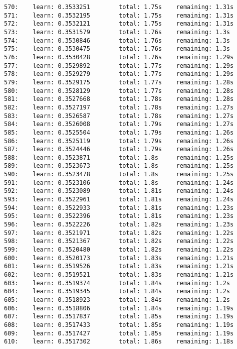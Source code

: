 \documentclass[11pt]{article}
\begin{document}
\begin{Verbatim}[commandchars=\\\{\}]
570:    learn: 0.3533251        total: 1.75s    remaining: 1.31s
571:    learn: 0.3532195        total: 1.75s    remaining: 1.31s
572:    learn: 0.3532121        total: 1.75s    remaining: 1.31s
573:    learn: 0.3531579        total: 1.76s    remaining: 1.3s
574:    learn: 0.3530846        total: 1.76s    remaining: 1.3s
575:    learn: 0.3530475        total: 1.76s    remaining: 1.3s
576:    learn: 0.3530428        total: 1.76s    remaining: 1.29s
577:    learn: 0.3529892        total: 1.77s    remaining: 1.29s
578:    learn: 0.3529279        total: 1.77s    remaining: 1.29s
579:    learn: 0.3529175        total: 1.77s    remaining: 1.28s
580:    learn: 0.3528129        total: 1.77s    remaining: 1.28s
581:    learn: 0.3527668        total: 1.78s    remaining: 1.28s
582:    learn: 0.3527197        total: 1.78s    remaining: 1.27s
583:    learn: 0.3526587        total: 1.78s    remaining: 1.27s
584:    learn: 0.3526008        total: 1.79s    remaining: 1.27s
585:    learn: 0.3525504        total: 1.79s    remaining: 1.26s
586:    learn: 0.3525119        total: 1.79s    remaining: 1.26s
587:    learn: 0.3524446        total: 1.79s    remaining: 1.26s
588:    learn: 0.3523871        total: 1.8s     remaining: 1.25s
589:    learn: 0.3523673        total: 1.8s     remaining: 1.25s
590:    learn: 0.3523478        total: 1.8s     remaining: 1.25s
591:    learn: 0.3523106        total: 1.8s     remaining: 1.24s
592:    learn: 0.3523089        total: 1.81s    remaining: 1.24s
593:    learn: 0.3522961        total: 1.81s    remaining: 1.24s
594:    learn: 0.3522933        total: 1.81s    remaining: 1.23s
595:    learn: 0.3522396        total: 1.81s    remaining: 1.23s
596:    learn: 0.3522226        total: 1.82s    remaining: 1.23s
597:    learn: 0.3521971        total: 1.82s    remaining: 1.22s
598:    learn: 0.3521367        total: 1.82s    remaining: 1.22s
599:    learn: 0.3520480        total: 1.82s    remaining: 1.22s
600:    learn: 0.3520173        total: 1.83s    remaining: 1.21s
601:    learn: 0.3519526        total: 1.83s    remaining: 1.21s
602:    learn: 0.3519521        total: 1.83s    remaining: 1.21s
603:    learn: 0.3519374        total: 1.84s    remaining: 1.2s
604:    learn: 0.3519345        total: 1.84s    remaining: 1.2s
605:    learn: 0.3518923        total: 1.84s    remaining: 1.2s
606:    learn: 0.3518806        total: 1.84s    remaining: 1.19s
607:    learn: 0.3517837        total: 1.85s    remaining: 1.19s
608:    learn: 0.3517433        total: 1.85s    remaining: 1.19s
609:    learn: 0.3517427        total: 1.85s    remaining: 1.19s
610:    learn: 0.3517302        total: 1.86s    remaining: 1.18s

\end{Verbatim}
\end{document}
